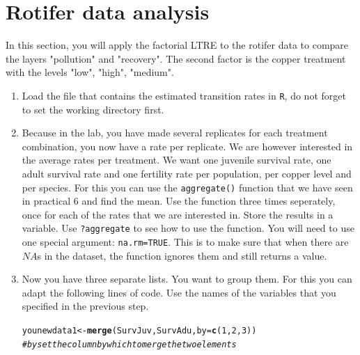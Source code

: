\documentclass{article}\usepackage[]{graphicx}\usepackage[]{color}
\makeatletter
\newcommand{\hlnum}[1]{\textcolor[rgb]{0.686,0.059,0.569}{#1}}%
\newcommand{\hlcom}[1]{\textcolor[rgb]{0.678,0.584,0.686}{\textit{#1}}}%
\newcommand{\hlstd}[1]{\textcolor[rgb]{0.345,0.345,0.345}{#1}}%
\newcommand{\hlkwb}[1]{\textcolor[rgb]{0.69,0.353,0.396}{#1}}%
\newcommand{\hlkwc}[1]{\textcolor[rgb]{0.333,0.667,0.333}{#1}}%
\newcommand{\hlkwd}[1]{\textcolor[rgb]{0.737,0.353,0.396}{\textbf{#1}}}%
\newenvironment{kframe}{%
 \def\at@end@of@kframe{}%
 \ifinner\ifhmode%
  \def\at@end@of@kframe{\end{minipage}}%
  \begin{minipage}{\columnwidth}%
 \fi\fi%
 \def\FrameCommand##1{\hskip\@totalleftmargin \hskip-\fboxsep
 \colorbox{shadecolor}{##1}\hskip-\fboxsep
     \hskip-\linewidth \hskip-\@totalleftmargin \hskip\columnwidth}%
 \MakeFramed {\advance\hsize-\width
   \@totalleftmargin\z@ \linewidth\hsize
   \@setminipage}}%
 {\par\unskip\endMakeFramed%
 \at@end@of@kframe}
\newenvironment{knitrout}{}{} %
\makeatother
\begin{document}
\section{Rotifer data analysis}
In this section, you will apply the factorial LTRE to the rotifer data to compare the layers "pollution" and "recovery". The second factor is the copper treatment with the levels "low", "high", "medium".
\begin{enumerate}
\item Load the file that contains the estimated transition rates in \texttt{R}, do not forget to set the working directory first. 
\item Because in the lab, you have made several replicates for each treatment combination, you now have a rate per replicate. We are however interested in the average rates per treatment. We want one juvenile survival rate, one adult survival rate and one fertility rate per population, per copper level and per species. For this you can use the \texttt{aggregate()} function that we have seen in practical $6$ and find the mean. Use the function three times seperately, once for each of the rates that we are interested in. Store the results in a variable. Use \texttt{?aggregate} to see how to use the function. You will need to use one special argument: \texttt{na.rm=TRUE}. This is to make sure that when there are $NA$s in the dataset, the function ignores them and still returns a value.
\item Now you have three separate lists. You want to group them. For this you can adapt the following lines of code. Use the names of the variables that you specified in the previous step.
\begin{knitrout}
\color{fgcolor}\begin{kframe}
\begin{alltt}
\hlstd{younewdata1}\hlkwb{<-}\hlkwd{merge}\hlstd{(SurvJuv, SurvAdu,} \hlkwc{by}\hlstd{=}\hlkwd{c}\hlstd{(}\hlnum{1}\hlstd{,}\hlnum{2}\hlstd{,}\hlnum{3}\hlstd{))}
\hlcom{#by set the column by which to merge the two elements}


\end{alltt}
\end{kframe}
\end{knitrout}
\end{enumerate}
\end{document}
